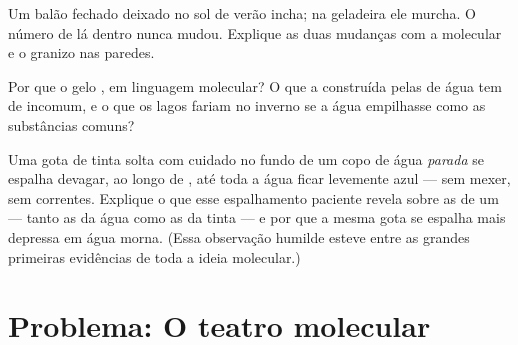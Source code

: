 \begin{exercise}[$\star\star$]\label{exo:g7:states-of-matter:10}
Um balão fechado deixado no sol de verão incha; na geladeira ele
murcha. O número de  lá dentro nunca mudou. Explique as
duas mudanças com a  molecular e o granizo nas paredes.
\end{exercise}

\begin{exercise}[$\star\star$]\label{exo:g7:states-of-matter:11}
Por que o gelo , em linguagem molecular? O que a 
construída pelas  de água tem de incomum, e o que os lagos
fariam no inverno se a água empilhasse como as substâncias comuns?
\end{exercise}

\begin{exercise}[$\star\star\star$]\label{exo:g7:states-of-matter:12}
Uma gota de tinta solta com cuidado no fundo de um copo de água
\emph{parada} se espalha devagar, ao longo de , até toda a água
ficar levemente azul --- sem mexer, sem correntes. Explique o que
esse espalhamento paciente revela sobre as  de um 
--- tanto as da água como as da tinta --- e por que a mesma gota se
espalha mais depressa em água morna. (Essa observação humilde esteve
entre as grandes primeiras evidências de toda a ideia molecular.)
\end{exercise}

\section{Problema: O teatro molecular}

